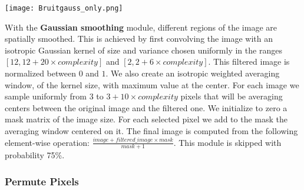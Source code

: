 \documentclass[smallcondensed]{svjour3}     %
\begin{document}
\begin{minipage}[t]{0.14\linewidth}
\begin{center}
\vspace*{6mm}
\texttt{[image: Bruitgauss\_only.png]}
\end{center}
\end{minipage}%
\hspace{0.3cm}\begin{minipage}[t]{0.86\linewidth}
With the {\bf Gaussian smoothing} module, 
different regions of the image are spatially smoothed.
This is achieved  by first convolving
the image with an isotropic Gaussian kernel of
size and variance chosen uniformly in the ranges $[12,12 + 20 \times
complexity]$ and $[2,2 + 6 \times complexity]$. This filtered image is normalized
between $0$ and $1$.  We also create an isotropic weighted averaging window, of the
kernel size, with maximum value at the center.  For each image we sample
uniformly from $3$ to $3 + 10 \times complexity$ pixels that will be
averaging centers between the original image and the filtered one.  We
initialize to zero a mask matrix of the image size. For each selected pixel
we add to the mask the averaging window centered on it.  The final image is
computed from the following element-wise operation: $\frac{image + filtered\_image
\times mask}{mask+1}$.
This module is skipped with probability 75\%.
\end{minipage}


\subsubsection*{Permute Pixels}
\end{document}
